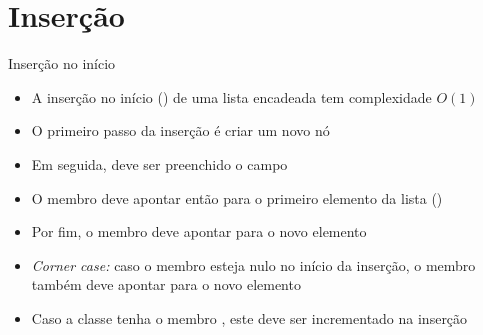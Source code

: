 \section{Inserção}

\begin{frame}[fragile]{Inserção no início}

    \begin{itemize}
        \item A inserção no início () de uma lista encadeada tem
            complexidade $O(1)$

        \item O primeiro passo da inserção é criar um novo nó

        \item Em seguida, deve ser preenchido o campo 

        \item O membro  deve apontar então para o primeiro elemento da lista
        ()

        \item Por fim, o membro  deve apontar para o novo elemento

        \item \textit{Corner case:} caso o membro  esteja nulo no início da 
            inserção, o membro  também deve apontar para o novo elemento

        \item Caso a classe tenha o membro , este deve ser incrementado
            na inserção
    \end{itemize}

\end{frame}

